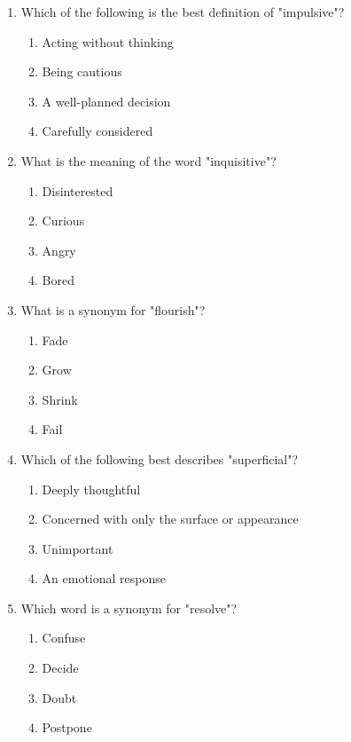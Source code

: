 \documentclass[12pt]{article}
\begin{document}
\begin{enumerate}
\item Which of the following is the best definition of "impulsive"?
\begin{enumerate}[label=\Alph*.]
    \item Acting without thinking
    \item Being cautious
    \item A well-planned decision
    \item Carefully considered
\end{enumerate}

\vspace{0.5cm}

\item What is the meaning of the word "inquisitive"?
\begin{enumerate}[label=\Alph*.]
    \item Disinterested
    \item Curious
    \item Angry
    \item Bored
\end{enumerate}

\vspace{0.5cm}

\item What is a synonym for "flourish"?
\begin{enumerate}[label=\Alph*.]
    \item Fade
    \item Grow
    \item Shrink
    \item Fail
\end{enumerate}

\vspace{0.5cm}

\item Which of the following best describes "superficial"?
\begin{enumerate}[label=\Alph*.]
    \item Deeply thoughtful
    \item Concerned with only the surface or appearance
    \item Unimportant
    \item An emotional response
\end{enumerate}

\vspace{0.5cm}

\item Which word is a synonym for "resolve"?
\begin{enumerate}[label=\Alph*.]
    \item Confuse
    \item Decide
    \item Doubt
    \item Postpone
\end{enumerate}


\end{enumerate}
\end{document}
